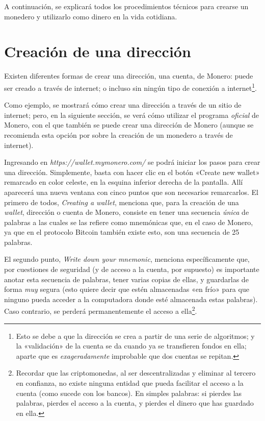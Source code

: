 \documentclass[12pt,a4paper,twoside]{book}
\begin{document}
A continuación, se explicará todos los procedimientos técnicos para crearse un monedero y utilizarlo como dinero en la vida cotidiana.

\section{Creación de una dirección}
Existen diferentes formas de crear una dirección, una cuenta, de Monero: puede ser creado a través de internet; o incluso sin ningún tipo de conexión a internet\footnote{Esto se debe a que la dirección se crea a partir de una serie de algoritmos; y la «validación» de la cuenta se da cuando ya se transfieren fondos en ella; aparte que es \textit{exageradamente} improbable que dos cuentas se repitan.}.

Como ejemplo, se mostrará cómo crear una dirección a través de un sitio de internet; pero, en la siguiente sección, se verá cómo utilizar el programa \textit{oficial} de Monero, con el que también se puede crear una dirección de Monero (aunque se recomienda esta opción por sobre la creación de un monedero a través de internet).

Ingresando en \textit{https://wallet.mymonero.com/} se podrá iniciar los pasos para crear una dirección. Simplemente, basta con hacer clic en el botón «Create new wallet» remarcado en color celeste, en la esquina inferior derecha de la pantalla. Allí aparecerá una nueva ventana con cinco puntos que son necesarios remarcarlos. El primero de todos, \textit{Creating a wallet}, menciona que, para la creación de una \textit{wallet}, dirección o cuenta de Monero, consiste en tener una secuencia \textit{única} de palabras a las cuales se las refiere como mnemónicas que, en el caso de Monero, ya que en el protocolo Bitcoin también existe esto, son una secuencia de 25 palabras.

El segundo punto, \textit{Write down your mnemonic}, menciona específicamente que, por cuestiones de seguridad (y de acceso a la cuenta, por supuesto) es importante anotar esta secuencia de palabras, tener varias copias de ellas, y guardarlas de forma \textit{muy} segura (esto quiere decir que estén almacenadas «en frío» para que ninguno pueda acceder a la computadora donde esté almacenada estas palabras). Caso contrario, se perderá permanentemente el acceso a ella\footnote{Recordar que las criptomonedas, al ser descentralizadas y eliminar al tercero en confianza, no existe ninguna entidad que pueda facilitar el acceso a la cuenta (como sucede con los bancos). En simples palabras: si pierdes las palabras, pierdes el acceso a la cuenta, y pierdes el dinero que has guardado en ella.}.
\end{document}
